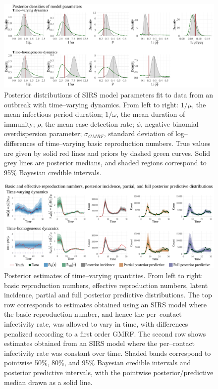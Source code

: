 \begin{figure}[htbp]
	\centering
	\includegraphics[width=\linewidth]{figures/sinfoi_lna_param_plots}
	\caption[Posterior distributions of SIRS model parameters fit to data from an outbreak with time--varying dynamics.]{Posterior distributions of SIRS model parameters fit to data from an outbreak with time--varying dynamics. From left to right: $ 1/\mu $, the mean infectious period duration; $ 1/\omega $, the mean duration of immunity; $ \rho $, the mean case detection rate; $ \phi $, negative binomial overdispersion parameter; $ \sigma_{GMRF} $, standard deviation of log--differences of time--varying basic reproduction numbers. True values are given by solid red lines and priors by dashed green curves. Solid grey lines are posterior medians, and shaded regions correspond to 95\% Bayesian credible intervals.}
	\label{fig:sinfoi_param_plots}
\end{figure}

\begin{figure}
	\centering
	\includegraphics[width=\linewidth]{figures/sinfoi_lna_tparam_plots}
	\caption[Time--varying reproduction numbers, latent incidence, and posterior predictive distributions for SIRS models fit to data from an outbreak with time--varying dynamics.]{Posterior estimates of time--varying quantities. From left to right: basic reproduction numbers, effective reproduction numbers, latent incidence, partial and full posterior predictive distributions. The top row corresponds to estimates obtained using an SIRS model where the basic reproduction number, and hence the per--contact infectivity rate, was allowed to vary in time, with differences penalized according to a first order GMRF. The second row shows estimates obtained from an SIRS model where the per--contact infectivity rate was constant over time. Shaded bands correspond to pointwise 50\%, 80\%, and 95\% Bayesian credible intervals and posterior predictive intervals, with the pointwise posterior/predictive median drawn as a solid line.}
	\label{fig:sinfoi_tparam_plots}
\end{figure}

